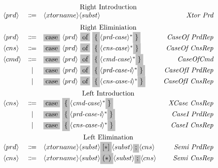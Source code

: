 \documentclass[11pt]{article}
\newcommand{\nonterminal}[1]{\langle #1 \rangle}
\newcommand{\terminal}[1]{\colorbox{lightgray}{#1}}
\begin{document}
\[
  \begin{array}{lclr}
    \multicolumn{4}{c}{\text{Right Introduction}} \\
    \nonterminal{prd} & \Coloneqq & \nonterminal{xtorname}\nonterminal{subst} & \emph{Xtor Prd} \\[0.2cm]
    \multicolumn{4}{c}{\text{Right Eliminiation}} \\
    \nonterminal{prd} & \Coloneqq & \terminal{case}\ \nonterminal{prd}\ \terminal{of}\ \terminal{\{} \nonterminal{\textit{prd-case}}^{\ast} \terminal{\}} & \emph{CaseOf PrdRep} \\
    \nonterminal{cns} & \Coloneqq & \terminal{case}\ \nonterminal{prd}\ \terminal{of}\ \terminal{\{} \nonterminal{\textit{cns-case}}^{\ast} \terminal{\}} & \emph{CaseOf CnsRep} \\
    \nonterminal{cmd} & \Coloneqq & \terminal{case}\ \nonterminal{prd}\ \terminal{of}\ \terminal{\{} \nonterminal{\textit{cmd-case}}^{\ast} \terminal{\}} & \emph{CaseOfCmd} \\
    & | & \terminal{case}\ \nonterminal{prd}\ \terminal{of}\ \terminal{\{} \nonterminal{\textit{prd-case-i}}^{\ast} \terminal{\}} & \emph{CaseOfI PrdRep} \\
    & | & \terminal{case}\ \nonterminal{prd}\ \terminal{of}\ \terminal{\{} \nonterminal{\textit{cns-case-i}}^{\ast} \terminal{\}} & \emph{CaseOfI CnsRep} \\[0.2cm]
    \multicolumn{4}{c}{\text{Left Introduction}} \\
    \nonterminal{cns} & \Coloneqq & \terminal{case}\ \terminal{\{} \nonterminal{\textit{cmd-case}}^{\ast} \terminal{\}} & \emph{XCase CnsRep} \\
    & | & \terminal{case}\ \terminal{\{} \nonterminal{\textit{prd-case-i}}^{\ast} \terminal{\}} & \emph{CaseI PrdRep} \\
    & | & \terminal{case}\ \terminal{\{} \nonterminal{\textit{cns-case-i}}^{\ast} \terminal{\}} & \emph{CaseI CnsRep} \\[0.2cm]
    \multicolumn{4}{c}{\text{Left Elimination}} \\
    \nonterminal{prd} & \Coloneqq & \nonterminal{xtorname}\nonterminal{subst}\terminal{$[\ast]$}\nonterminal{subst}\terminal{;}\nonterminal{cns} & \emph{Semi PrdRep} \\
    \nonterminal{cns} & \Coloneqq & \nonterminal{xtorname}\nonterminal{subst}\terminal{$(\ast)$}\nonterminal{subst}\terminal{;}\nonterminal{cns} & \emph{Semi CnsRep} \\
  \end{array}
\]
\end{document}
